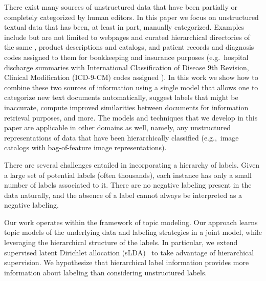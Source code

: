There exist many sources of unstructured data that have been partially or
completely categorized by human editors.  In this paper we focus on
unstructured textual data that has been, at least in part, manually
categorized.  Examples include but are not limited to webpages and curated
hierarchical directories of the same \citep{DMOZ}, product descriptions and
catalogs, %
and patient records %
and diagnosis codes assigned to them for bookkeeping and insurance purposes
(e.g.~hospital discharge summaries with 
International Classification of Disease 9th Revision, Clinical Modification
(ICD-9-CM) codes assigned \cite{ICD9}).  In this work we show how to combine
these two sources of information using a single model that allows one to
categorize new text documents automatically, suggest labels that might be
inaccurate, compute improved similarities between documents for information
retrieval purposes, and more. The models and techniques that we develop in
this paper are applicable in other domains as well, namely, any unstructured
representations of data that have been hierarchically classified (e.g.,~image
catalogs with bag-of-feature image representations).

There are several challenges entailed in incorporating a hierarchy of labels.
Given a large set of potential labels (often thousands), each instance has only
a small number of labels associated to it. There are no negative labeling
present in the data naturally, and the absence of a label cannot always be
interpreted as a negative labeling. 


Our work operates within the framework of topic modeling. Our approach learns
topic models of the underlying data and labeling strategies in a joint model,
while leveraging the hierarchical structure of the labels. In particular, we
extend supervised latent Dirichlet allocation (sLDA)~\cite{BleiMcAuliffe2008}
to take advantage of hierarchical supervision. We hypothesize that hierarchical
label information provides more information about labeling than considering
unstructured labels.

